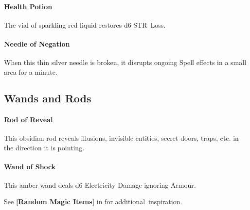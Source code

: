\documentclass[itdr/core]{subfiles}
\begin{document}
\paragraph{Health Potion}
The vial of sparkling red liquid restores d6 STR~Loss.

\paragraph{Needle of Negation}
When this thin silver needle is broken, it disrupts ongoing Spell effects in a small area for a minute.

\vfill

\subsection*{Wands and Rods}

\paragraph{Rod of Reveal}
This obsidian rod reveals illusions, invisible entities, secret doors, traps, etc. in the direction it is pointing.

\paragraph{Wand of Shock}
This amber wand deals d6 Electricity Damage \mbox{ignoring} Armour.

\vfill

\begin{dbox}
	See \textbf{[Random Magic Items]} in \textbf{} for \mbox{additional inspiration}.
\end{dbox}

\vfill
\end{document}
